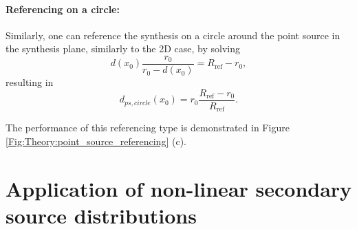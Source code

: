 \documentclass[12pt,a4paper]{article}
\begin{document}
\paragraph{Referencing on a circle:\\}
Similarly, one can reference the synthesis on a circle around the point source in the synthesis plane, similarly to the 2D case, by solving 
\begin{equation}
d(x_0)\frac{r_0}{r_0 - d(x_0)} = R_{\mathrm{ref}} - r_0,
\end{equation}
resulting in
\begin{equation}
d_{ps,circle}(x_0)  = r_0 \frac{R_{\mathrm{ref}} - r_0}{R_{\mathrm{ref}}}.
\end{equation}

The performance of this referencing type is demonstrated in Figure \ref{Fig:Theory:point_source_referencing} (c).

\section{Application of non-linear secondary source distributions}
\end{document}
